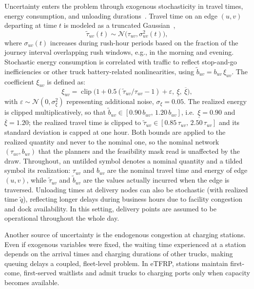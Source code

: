 \documentclass[a4paper,fleqn]{cas-sc}
\begin{document}
Uncertainty enters the problem through exogenous stochasticity in travel times, energy consumption, and unloading durations~\cite{lombard2018modelling}. Travel time on an edge $(u,v)$ departing at time $t$ is modeled as a truncated Gaussian~\cite{RODRIGUES2018636},
\begin{equation}
\tilde{\tau}_{uv}(t) \sim \mathcal{N}\!\big(\tau_{uv},\sigma_{uv}^2(t)\big),
\label{eq:unc_travel}
\end{equation}
where $\sigma_{uv}(t)$ increases during rush-hour periods based on the fraction of the journey interval overlapping rush windows, e.g., in the morning and evening.
Stochastic energy consumption is correlated with traffic to reflect stop-and-go inefficiencies or other truck battery-related nonlinearities, using $\tilde{b}_{uv} = b_{uv}\,\xi_{uv}$. The coefficient $\xi_{uv}$ is defined as:
\begin{equation}
\xi_{uv} =
\operatorname{clip}\!\Big(
1 + 0.5(\tilde{\tau}_{uv}/\tau_{uv}-1) + \varepsilon,\ \underline{\xi},\ \overline{\xi}
\Big),
\label{eq:unc_energy}
\end{equation}
with $\varepsilon\sim\mathcal{N}(0,\sigma_\xi^2)$ representing additional noise, $\sigma_\xi=0.05$. The realized energy is clipped multiplicatively, so that $\tilde{b}_{uv}\in[0.90\,b_{uv},\,1.20\,b_{uv}]$, i.e.\ $\underline{\xi}=0.90$ and $\overline{\xi}=1.20$; the realized travel time is clipped to $\tilde{\tau}_{uv}\in[0.85\,\tau_{uv},\,2.50\,\tau_{uv}]$ and its standard deviation is capped at one hour. Both bounds are applied to the realized quantity and never to the nominal one, so the nominal network $(\tau_{uv},b_{uv})$ that the planners and the feasibility mask read is unaffected by the draw. Throughout, an untilded symbol denotes a nominal quantity and a tilded symbol its realization: $\tau_{uv}$ and $b_{uv}$ are the nominal travel time and energy of edge $(u,v)$, while $\tilde{\tau}_{uv}$ and $\tilde{b}_{uv}$ are the values actually incurred when the edge is traversed. 
Unloading times at delivery nodes can also be stochastic (with realized time $\tilde{q}$), reflecting longer delays during business hours due to facility congestion and dock availability. In this setting, delivery points are assumed to be operational throughout the whole day.

Another source of uncertainty is the endogenous congestion at charging stations. Even if exogenous variables were fixed, the waiting time experienced at a station depends on the arrival times and charging durations of other trucks, making queuing delays a coupled, fleet-level problem. In eTFRP, stations maintain first-come, first-served waitlists and admit trucks to charging ports only when capacity becomes available.
\end{document}
